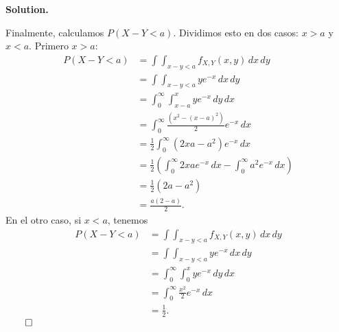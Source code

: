 \documentclass{article}
\theoremstyle{problemstyle}
\newenvironment{solution}{%
  \begin{mdframed}[linewidth=0.8pt,linecolor=Gray,backgroundcolor=Gray!5,roundcorner=5pt]%
  \noindent\textbf{Solution.}%
}{%
\hfill $ \qed $ 
  \end{mdframed}%
}
\begin{document}
\begin{solution}
	Finalmente, calculamos $ P(X-Y<a) $. Dividimos esto en dos casos: $ x > a $ y $ x < a $. Primero $ x > a $:
	\begin{align*}
		P(X-Y<a) & = \int\int_{x-y<a} f_{X,Y}(x,y)\,dx\,dy                                                   \\
		         & =\int\int_{x-y<a}ye^{-x}\,dx\,dy                                                          \\
		         & =\int_{0}^{\infty}\int_{x-a}^{x}ye^{-x}\,dy\,dx                                           \\
		         & =\int_{0}^{\infty}\frac{(x^{2} - (x-a)^{2})}{2}e^{-x}\,dx                                 \\
		         & =\frac{1}{2}\int_{0}^{\infty}(2xa - a^2)e^{-x}\,dx                                        \\
		         & =\frac{1}{2}\left(\int_{0}^{\infty}2xae^{-x}\,dx - \int_{0}^{\infty}a^2 e^{-x}\,dx\right) \\
		         & =\frac{1}{2}\left(2a - a^2\right)                                                         \\
		         & =\frac{a(2-a)}{2}.
	\end{align*}
	En el otro caso, si $ x < a $, tenemos
	\begin{align*}
		P(X-Y<a) & = \int\int_{x-y<a} f_{X,Y}(x,y)\,dx\,dy       \\
		         & =\int\int_{x-y<a}ye^{-x}\,dx\,dy              \\
		         & =\int_{0}^{\infty}\int_{0}^{x}ye^{-x}\,dy\,dx \\
		         & =\int_{0}^{\infty}\frac{x^{2}}{2}e^{-x}\,dx   \\
		         & = \frac{1}{2}.
	\end{align*}
\end{solution}
\end{document}
